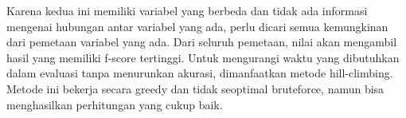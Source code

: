 Karena kedua \AMR{} ini memiliki variabel yang berbeda dan tidak ada informasi mengenai hubungan antar variabel yang ada, perlu dicari semua kemungkinan dari pemetaan variabel yang ada.
Dari seluruh pemetaan, nilai \SMATCH{} akan mengambil hasil yang memiliki f-score tertinggi.
Untuk mengurangi waktu yang dibutuhkan dalam evaluasi tanpa menurunkan akurasi, dimanfaatkan metode hill-climbing.
Metode ini bekerja secara greedy dan tidak seoptimal bruteforce, namun bisa menghasilkan perhitungan yang cukup baik.

